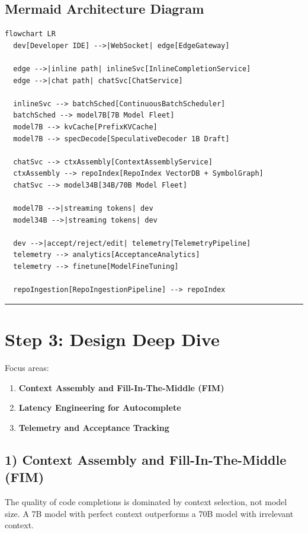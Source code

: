 \subsection*{Mermaid Architecture Diagram}

\begin{verbatim}
flowchart LR
  dev[Developer IDE] -->|WebSocket| edge[EdgeGateway]

  edge -->|inline path| inlineSvc[InlineCompletionService]
  edge -->|chat path| chatSvc[ChatService]

  inlineSvc --> batchSched[ContinuousBatchScheduler]
  batchSched --> model7B[7B Model Fleet]
  model7B --> kvCache[PrefixKVCache]
  model7B --> specDecode[SpeculativeDecoder 1B Draft]

  chatSvc --> ctxAssembly[ContextAssemblyService]
  ctxAssembly --> repoIndex[RepoIndex VectorDB + SymbolGraph]
  chatSvc --> model34B[34B/70B Model Fleet]

  model7B -->|streaming tokens| dev
  model34B -->|streaming tokens| dev

  dev -->|accept/reject/edit| telemetry[TelemetryPipeline]
  telemetry --> analytics[AcceptanceAnalytics]
  telemetry --> finetune[ModelFineTuning]

  repoIngestion[RepoIngestionPipeline] --> repoIndex
\end{verbatim}

\bigskip\hrule\bigskip

\section*{Step 3: Design Deep Dive}

Focus areas:

\begin{enumerate}
  \item \textbf{Context Assembly and Fill-In-The-Middle (FIM)}
  \item \textbf{Latency Engineering for Autocomplete}
  \item \textbf{Telemetry and Acceptance Tracking}
\end{enumerate}

\subsection*{1) Context Assembly and Fill-In-The-Middle (FIM)}

The quality of code completions is dominated by context selection, not model size. A 7B model with perfect context outperforms a 70B model with irrelevant context.

